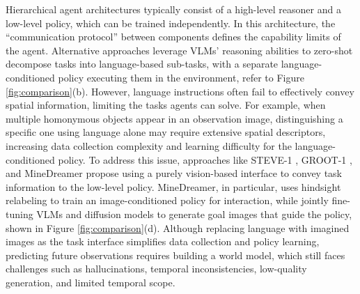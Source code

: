 Hierarchical agent architectures typically consist of a high-level reasoner and a low-level policy, which can be trained independently. In this architecture, the ``communication protocol'' between components defines the capability limits of the agent. Alternative approaches \citep{deps, voyager, palm-e} leverage VLMs’ reasoning abilities to zero-shot decompose tasks into language-based sub-tasks, with a separate language-conditioned policy executing them in the environment, refer to Figure \ref{fig:comparison}(b). However, language instructions often fail to effectively convey spatial information, limiting the tasks agents can solve. For example, when multiple homonymous objects appear in an observation image, distinguishing a specific one using language alone may require extensive spatial descriptors, increasing data collection complexity and learning difficulty for the language-conditioned policy. 
To address this issue, approaches like STEVE-1 \citep{steve1}, GROOT-1 \citep{groot1}, and MineDreamer \citep{minedreamer} propose using a purely vision-based interface to convey task information to the low-level policy. MineDreamer, in particular, uses hindsight relabeling to train an image-conditioned policy \citep{steve1} for interaction, while jointly fine-tuning VLMs and diffusion models to generate goal images that guide the policy, shown in Figure \ref{fig:comparison}(d). Although replacing language with imagined images as the task interface simplifies data collection and policy learning, predicting future observations requires building a world model, which still faces challenges such as hallucinations, temporal inconsistencies, low-quality generation, and limited temporal scope. 

